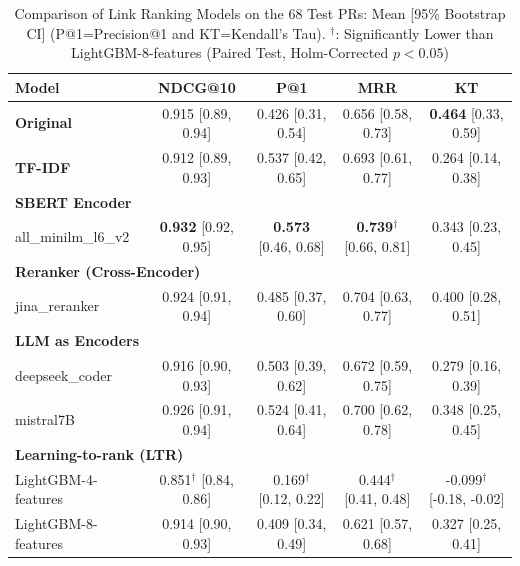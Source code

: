 \begin{table}[t]
\centering
\caption{Comparison of Link Ranking Models on the 68 Test PRs: Mean [95\% Bootstrap CI] (P@1=Precision@1 and KT=Kendall's Tau). $^\dagger$: Significantly Lower than LightGBM-8-features (Paired Test, Holm-Corrected $p<0.05$)}
\label{tab:autoeval}
\small
\begin{tabular}{lcccc}
\toprule
\textbf{Model} & \textbf{NDCG@10} & \textbf{P@1} & \textbf{MRR} & \textbf{KT} \\
\midrule
\textbf{Original} & 0.915 {\footnotesize[0.89, 0.94]} & 0.426 {\footnotesize[0.31, 0.54]} & 0.656 {\footnotesize[0.58, 0.73]} & \textbf{0.464} {\footnotesize[0.33, 0.59]} \\
\midrule
\textbf{TF-IDF} & 0.912 {\footnotesize[0.89, 0.93]} & 0.537 {\footnotesize[0.42, 0.65]} & 0.693 {\footnotesize[0.61, 0.77]} & 0.264 {\footnotesize[0.14, 0.38]} \\
\midrule
\multicolumn{5}{l}{\textbf{SBERT Encoder}} \\
all\_minilm\_l6\_v2 & \textbf{0.932} {\footnotesize[0.92, 0.95]} & \textbf{0.573} {\footnotesize[0.46, 0.68]} & \textbf{0.739}$^\dagger$ {\footnotesize[0.66, 0.81]} & 0.343 {\footnotesize[0.23, 0.45]} \\
\midrule
\multicolumn{5}{l}{\textbf{Reranker (Cross-Encoder)}} \\
jina\_reranker & 0.924 {\footnotesize[0.91, 0.94]} & 0.485 {\footnotesize[0.37, 0.60]} & 0.704 {\footnotesize[0.63, 0.77]} & 0.400 {\footnotesize[0.28, 0.51]} \\
\midrule
\multicolumn{5}{l}{\textbf{LLM as Encoders}} \\
deepseek\_coder & 0.916 {\footnotesize[0.90, 0.93]} & 0.503 {\footnotesize[0.39, 0.62]} & 0.672 {\footnotesize[0.59, 0.75]} & 0.279 {\footnotesize[0.16, 0.39]} \\
mistral7B & 0.926 {\footnotesize[0.91, 0.94]} & 0.524 {\footnotesize[0.41, 0.64]} & 0.700 {\footnotesize[0.62, 0.78]} & 0.348 {\footnotesize[0.25, 0.45]} \\
\midrule
\multicolumn{5}{l}{\textbf{Learning-to-rank (LTR)}} \\
LightGBM-4-features & 0.851$^\dagger$ {\footnotesize[0.84, 0.86]} & 0.169$^\dagger$ {\footnotesize[0.12, 0.22]} & 0.444$^\dagger$ {\footnotesize[0.41, 0.48]} & -0.099$^\dagger$ {\footnotesize[-0.18, -0.02]} \\
LightGBM-8-features & 0.914 {\footnotesize[0.90, 0.93]} & 0.409 {\footnotesize[0.34, 0.49]} & 0.621 {\footnotesize[0.57, 0.68]} & 0.327 {\footnotesize[0.25, 0.41]} \\
\bottomrule
\end{tabular}
\end{table}
